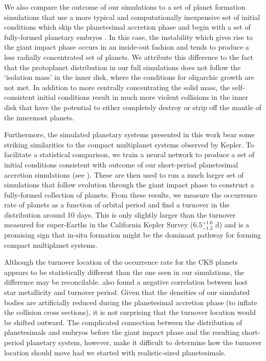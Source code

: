 We also compare the outcome of our simulations to a set of planet formation simulations that use a more typical and computationally inexpensive set of initial conditions which skip the planetesimal accretion phase and begin with a set of fully-formed planetary embryos \cite{raymond05, raymond06, hansen12}. In this case, the instability which gives rise to the giant impact phase occurs in an inside-out fashion and tends to produce a less radially concentrated set of planets. We attribute this difference to the fact that the protoplanet distribution in our full simulations does not follow the `isolation mass' in the inner disk, where the conditions for oligarchic growth are not met. In addition to more centrally concentrating the solid mass, the self-consistent initial conditions result in much more violent collisions in the inner disk that have the potential to either completely destroy or strip off the mantle \cite{marcus09} of the innermost planets.

Furthermore, the simulated planetary systems presented in this work bear some striking similarities to the compact multiplanet systems observed by Kepler. To facilitate a statistical comparison, we train a neural network to produce a set of initial conditions consistent with outcome of our short-period planetesimal accretion simulations (see \cite{wallace23}). These are then used to run a much larger set of simulations that follow evolution through the giant impact phase to construct a fully-formed collection of planets. From these results, we measure the occurrence rate of planets as a function of orbital period and find a turnover in the distribution around 10 days. This is only slightly larger than the turnover measured for super-Earths in the California Kepler Survey ($6.5^{+1.6}_{-1.2}$ d) \cite{petigura18} and is a promising sign that in-situ formation might be the dominant pathway for forming compact multiplanet systems.

Although the turnover location of the occurrence rate for the CKS planets appears to be statistically different than the one seen in our simulations, the difference may be reconcilable. \cite{petigura18} also found a negative correlation between host star metallicity and turnover period. Given that the densities of our simulated bodies are artificially reduced during the planetesimal accretion phase (to inflate the collision cross sections), it is not surprising that the turnover location would be shifted outward. The complicated connection between the distribution of planetesimals and embryos before the giant impact phase and the resulting short-period planetary system, however, make it difficult to determine how the turnover location should move had we started with realistic-sized planetesimals.

